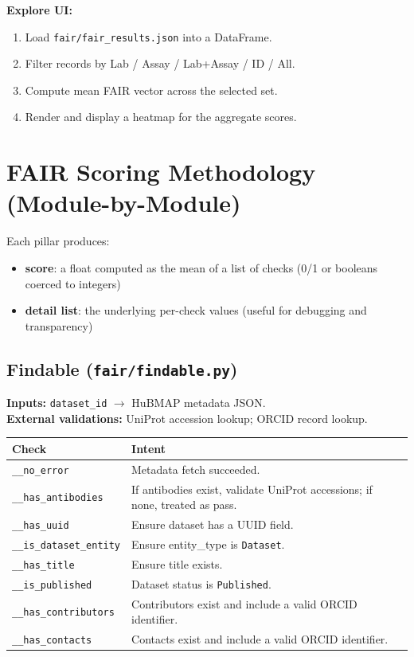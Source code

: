 \documentclass[11pt]{article}
\begin{document}
\textbf{Explore UI:}
\begin{enumerate}[leftmargin=2em]
  \item Load \texttt{fair/fair\_results.json} into a DataFrame.
  \item Filter records by Lab / Assay / Lab+Assay / ID / All.
  \item Compute mean FAIR vector across the selected set.
  \item Render and display a heatmap for the aggregate scores.
\end{enumerate}

\section{FAIR Scoring Methodology (Module-by-Module)}
Each pillar produces:
\begin{itemize}[leftmargin=2em]
  \item \textbf{score}: a float computed as the mean of a list of checks (0/1 or booleans coerced to integers)
  \item \textbf{detail list}: the underlying per-check values (useful for debugging and transparency)
\end{itemize}

\subsection{Findable (\texttt{fair/findable.py})}
\textbf{Inputs:} \texttt{dataset\_id} \(\rightarrow\) HuBMAP metadata JSON.\\
\textbf{External validations:} UniProt accession lookup; ORCID record lookup.

\begin{center}
\begin{tabular}{@{}p{}p{}@{}}
\toprule
\textbf{Check} & \textbf{Intent} \\
\midrule
\texttt{\_\_no\_error} & Metadata fetch succeeded. \\
\texttt{\_\_has\_antibodies} & If antibodies exist, validate UniProt accessions; if none, treated as pass. \\
\texttt{\_\_has\_uuid} & Ensure dataset has a UUID field. \\
\texttt{\_\_is\_dataset\_entity} & Ensure entity\_type is \texttt{Dataset}. \\
\texttt{\_\_has\_title} & Ensure title exists. \\
\texttt{\_\_is\_published} & Dataset status is \texttt{Published}. \\
\texttt{\_\_has\_contributors} & Contributors exist and include a valid ORCID identifier. \\
\texttt{\_\_has\_contacts} & Contacts exist and include a valid ORCID identifier. \\
\bottomrule
\end{tabular}
\end{center}
\end{document}
